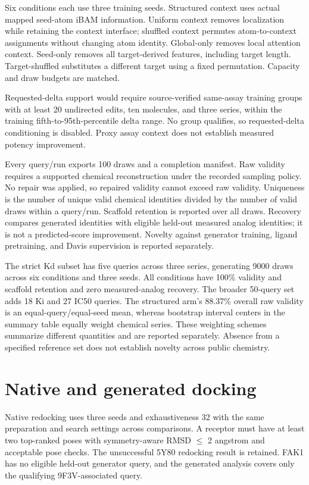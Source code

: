 \documentclass[12pt,a4paper]{article}
\begin{document}
Six conditions each use three training seeds. Structured context uses actual mapped seed-atom iBAM information. Uniform context removes localization while retaining the context interface; shuffled context permutes atom-to-context assignments without changing atom identity. Global-only removes local attention context. Seed-only removes all target-derived features, including target length. Target-shuffled substitutes a different target using a fixed permutation. Capacity and draw budgets are matched.

Requested-delta support would require source-verified same-assay training groups with at least 20 undirected edits, ten molecules, and three series, within the training fifth-to-95th-percentile delta range. No group qualifies, so requested-delta conditioning is disabled. Proxy assay context does not establish measured potency improvement.

Every query/run exports 100 draws and a completion manifest. Raw validity requires a supported chemical reconstruction under the recorded sampling policy. No repair was applied, so repaired validity cannot exceed raw validity. Uniqueness is the number of unique valid chemical identities divided by the number of valid draws within a query/run. Scaffold retention is reported over all draws. Recovery compares generated identities with eligible held-out measured analog identities; it is not a predicted-score improvement. Novelty against generator training, ligand pretraining, and Davis supervision is reported separately.

The strict Kd subset has five queries across three series, generating 9000 draws across six conditions and three seeds. All conditions have 100\% validity and scaffold retention and zero measured-analog recovery. The broader 50-query set adds 18 Ki and 27 IC50 queries. The structured arm's 88.37\% overall raw validity is an equal-query/equal-seed mean, whereas bootstrap interval centers in the summary table equally weight chemical series. These weighting schemes summarize different quantities and are reported separately. Absence from a specified reference set does not establish novelty across public chemistry.

\section*{Native and generated docking}
Native redocking uses three seeds and exhaustiveness 32 with the same preparation and search settings across comparisons. A receptor must have at least two top-ranked poses with symmetry-aware RMSD \(\leq\) 2 angstrom and acceptable pose checks. The unsuccessful 5Y80 redocking result is retained. FAK1 has no eligible held-out generator query, and the generated analysis covers only the qualifying 9F3V-associated query.
\end{document}
